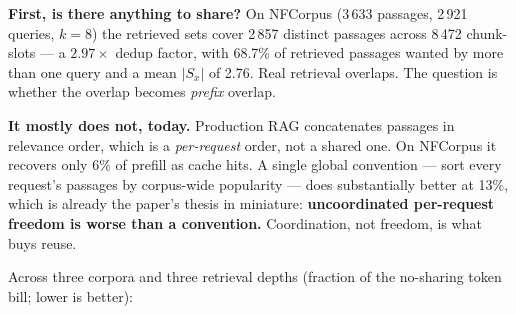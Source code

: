 \documentclass[11pt]{article}
\theoremstyle{plain}
\begin{document}
\textbf{First, is there anything to share?} On NFCorpus (3\,633 passages, 2\,921 queries, $k=8$) the retrieved sets cover 2\,857 distinct passages across 8\,472 chunk-slots --- a $2.97\times$ dedup factor, with 68.7\% of retrieved passages wanted by more than one query and a mean $|S_x|$ of 2.76. Real retrieval overlaps. The question is whether the overlap becomes \emph{prefix} overlap.

\textbf{It mostly does not, today.} Production RAG concatenates passages in relevance order, which is a \emph{per-request} order, not a shared one. On NFCorpus it recovers only 6\% of prefill as cache hits. A single global convention --- sort every request's passages by corpus-wide popularity --- does substantially better at 13\%, which is already the paper's thesis in miniature: \textbf{uncoordinated per-request freedom is worse than a convention.} Coordination, not freedom, is what buys reuse.

Across three corpora and three retrieval depths (fraction of the no-sharing token bill; lower is better):

\begin{center}\small
{}\end{center}
\end{document}
